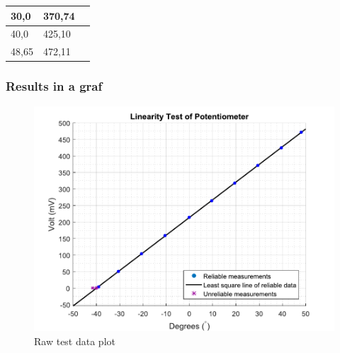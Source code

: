 \begin{table}[H]
\begin{tabular}{|l|l|p{4.3cm}|}
		30,0                              			  & 370,74               \\
		\hline%
		40,0                                          & 425,10               \\
		\hline%
		48,65 										  & 472,11               \\
		\hline%
	\end{tabular}
\end{table}
	
			
\subsubsection{Results in a graf}
\begin{figure}[H] 
	\centering 
	\includegraphics[scale=0.7]{figures/linearityOfPotmeterTest2-1}
	\caption{Raw test data plot}
	\label{linearityOfPotmeterTest2-1}
\end{figure}

